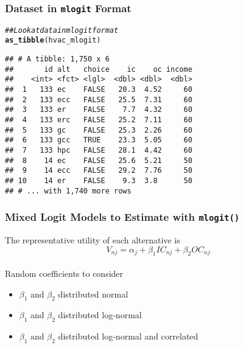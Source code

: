 \documentclass{beamer}\usepackage[]{graphicx}\usepackage[]{color}
\makeatletter
\newcommand{\hlcom}[1]{\textcolor[rgb]{0.678,0.584,0.686}{\textit{#1}}}%
\newcommand{\hlstd}[1]{\textcolor[rgb]{0.345,0.345,0.345}{#1}}%
\newcommand{\hlkwd}[1]{\textcolor[rgb]{0.737,0.353,0.396}{\textbf{#1}}}%
\newenvironment{kframe}{%
 \def\at@end@of@kframe{}%
 \ifinner\ifhmode%
  \def\at@end@of@kframe{\end{minipage}}%
  \begin{minipage}{\columnwidth}%
 \fi\fi%
 \def\FrameCommand##1{\hskip\@totalleftmargin \hskip-\fboxsep
 \colorbox{shadecolor}{##1}\hskip-\fboxsep
     \hskip-\linewidth \hskip-\@totalleftmargin \hskip\columnwidth}%
 \MakeFramed {\advance\hsize-\width
   \@totalleftmargin\z@ \linewidth\hsize
   \@setminipage}}%
 {\par\unskip\endMakeFramed%
 \at@end@of@kframe}
\newenvironment{knitrout}{}{} %
\makeatother
\begin{document}
\begin{frame}[fragile]\frametitle{Dataset in \texttt{mlogit} Format}
\begin{knitrout}\footnotesize
{}\color{fgcolor}\begin{kframe}
\begin{alltt}
\hlcom{## Look at data in mlogit format}
\hlkwd{as_tibble}\hlstd{(hvac_mlogit)}
\end{alltt}
\begin{verbatim}
## # A tibble: 1,750 x 6
##       id alt   choice    ic    oc income
##    <int> <fct> <lgl>  <dbl> <dbl>  <dbl>
##  1   133 ec    FALSE   20.3  4.52     60
##  2   133 ecc   FALSE   25.5  7.31     60
##  3   133 er    FALSE    7.7  4.32     60
##  4   133 erc   FALSE   25.2  7.11     60
##  5   133 gc    FALSE   25.3  2.26     60
##  6   133 gcc   TRUE    23.3  5.05     60
##  7   133 hpc   FALSE   28.1  4.42     60
##  8    14 ec    FALSE   25.6  5.21     50
##  9    14 ecc   FALSE   29.2  7.76     50
## 10    14 er    FALSE    9.3  3.8      50
## # ... with 1,740 more rows
\end{verbatim}
\end{kframe}
\end{knitrout}
\end{frame}

\begin{frame}\frametitle{Mixed Logit Models to Estimate with \texttt{mlogit()}}
    The representative utility of each alternative is
    $$V_{nj} = \alpha_j + \beta_1 IC_{nj} + \beta_2 OC_{nj}$$ \\
    \vspace{3ex}
    Random coefficients to consider
    \begin{itemize}
    	\item $\beta_1$ and $\beta_2$ distributed normal
    	\item $\beta_1$ and $\beta_2$ distributed log-normal
    	\item $\beta_1$ and $\beta_2$ distributed log-normal and correlated
    \end{itemize}
\end{frame}
\end{document}
